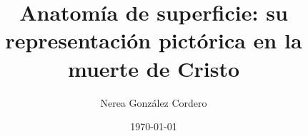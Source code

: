 \documentclass[a4paper,11pt]{article} %
\begin{document}
\pagestyle{empty}
\title{Anatomía de superficie: su representación pictórica en la muerte de Cristo}
\author{Nerea González Cordero}
\date{\today}
\maketitle %
\newpage %


\tableofcontents %
\newpage

\pagestyle{fancy} %




\newpage
%

%






\nocite{*} %



\clearpage
\begin{appendices}
\let\clearpage\relax

\end{appendices}
\end{document}
